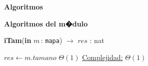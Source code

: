 \documentclass[a4paper,10pt]{article}
\let\TipoVariable=\texttt
\let\ModificadorArgumento=\textbf
\newcommand{\In}[2]{\ModificadorArgumento{in} \ensuremath{#1}\,: \TipoVariable{#2}\xspace}
\newenvironment{Algoritmos}{%
  \vspace*{2ex}%
  \noindent\textbf{\Large Algoritmos}%
  \vspace*{2ex}%
}{}
\newcommand{\Titulo}[1]{
  \vspace*{1ex}\par\noindent\textbf{\large #1}\par
}
\begin{document}
{\begin{Algoritmos}
\medskip
	
 \Titulo{Algoritmos del m�dulo}
  	\medskip
  
\begin{algorithm}[H]{\textbf{iTam}(\In{m}{mapa}) $\to$ $res$ : nat}
    	\begin{algorithmic}[1]
       \State $res \gets m.tamano$ \Comment $\Theta(1)$
			\medskip
			\Statex \underline{Complejidad:} $\Theta(1)$
    	\end{algorithmic}
\end{algorithm}
\end{Algoritmos}

\newpage
\end{document}
